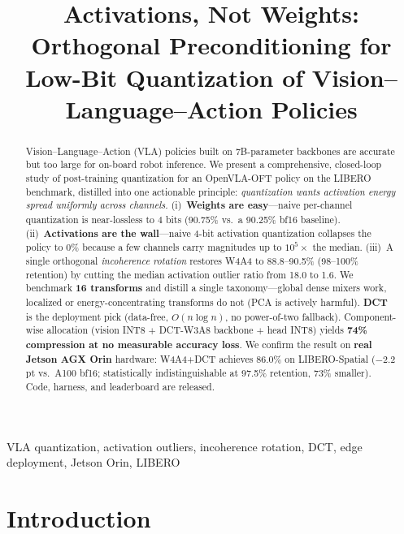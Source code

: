 \documentclass[conference]{IEEEtran}
\begin{document}
\title{Activations, Not Weights: Orthogonal Preconditioning for\\
Low-Bit Quantization of Vision--Language--Action Policies}

\author{
}

\maketitle

\begin{abstract}
Vision--Language--Action (VLA) policies built on 7B-parameter backbones are accurate but too large
for on-board robot inference. We present a comprehensive, closed-loop study of post-training
quantization for an OpenVLA-OFT policy on the LIBERO benchmark, distilled into one actionable
principle: \emph{quantization wants activation energy spread uniformly across channels.}
(i)~\textbf{Weights are easy}---naive per-channel quantization is near-lossless to 4 bits
(90.75\% vs.\ a 90.25\% bf16 baseline). (ii)~\textbf{Activations are the wall}---naive 4-bit
activation quantization collapses the policy to 0\% because a few channels carry magnitudes up to
$10^5\times$ the median. (iii)~A single orthogonal \emph{incoherence rotation} restores W4A4 to
88.8--90.5\% (98--100\% retention) by cutting the median activation outlier ratio from 18.0 to 1.6.
We benchmark \textbf{16 transforms} and distill a single taxonomy---global dense mixers work,
localized or energy-concentrating transforms do not (PCA is actively harmful). \textbf{DCT} is the
deployment pick (data-free, $O(n\log n)$, no power-of-two fallback). Component-wise allocation
(vision INT8 $+$ DCT-W3A8 backbone $+$ head INT8) yields \textbf{74\% compression at no measurable
accuracy loss}. We confirm the result on \textbf{real Jetson AGX Orin} hardware: W4A4+DCT achieves
86.0\% on LIBERO-Spatial ($-2.2$\,pt vs.\ A100 bf16; statistically indistinguishable at 97.5\%
retention, 73\% smaller). Code, harness, and leaderboard are released.
\end{abstract}

\begin{IEEEkeywords}
VLA quantization, activation outliers, incoherence rotation, DCT, edge deployment, Jetson Orin, LIBERO
\end{IEEEkeywords}

\section{Introduction}
\end{document}
